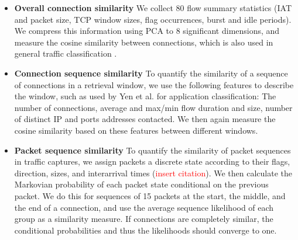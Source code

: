 \documentclass[sigconf]{acmart}
\begin{document}



\begin{itemize}
\item \textbf{Overall connection similarity} We collect 80 flow summary statistics (IAT and packet size, TCP window sizes, flag occurrences, burst and idle periods). We compress this information using PCA to 8 significant dimensions, and measure the cosine similarity between connections, which is also used in general traffic classification \cite{aun2017review}.
\item \textbf{Connection sequence similarity} 
To quantify the similarity of a sequence of connections in a retrieval window, we use the following features to describe the window, such as used by Yen et al. \cite{yen2009browser} for application classification: The number of connections, average and max/min flow duration and size, number of distinct IP and ports addresses contacted. We then again measure the cosine similarity based on these features between different windows. 
\item \textbf{Packet sequence similarity} To quantify the similarity of packet sequences in traffic captures, we assign packets a discrete state according to their flags, direction, sizes, and interarrival times (\textcolor{red}{insert citation}). We then calculate the Markovian probability of each packet state conditional on the previous packet. We do this for sequences of 15 packets at the start, the middle, and the end of a connection, and use the average sequence likelihood of each group as a similarity measure. If connections are completely similar, the conditional probabilities and thus the likelihoods should converge to one.
\end{itemize}
\end{document}
